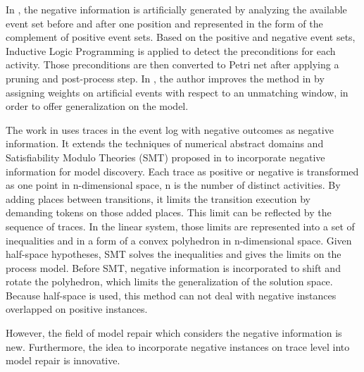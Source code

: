 In  \cite{goedertier2009robust}, the negative information is artificially generated by analyzing the available event set before and after one position and represented in the form of the complement of positive event sets. Based on the positive and negative event sets, Inductive Logic Programming is applied to detect the preconditions for each activity. Those preconditions are then converted to Petri net after applying a pruning and post-process step. In  \cite{vanden2014determining}, the author improves the method in  \cite{goedertier2009robust} by assigning weights on artificial events with respect to an unmatching window, in order to offer generalization on the model. 

The work in  \cite{ponce2016incorporating} uses traces in the event log with negative outcomes as negative information. It extends the techniques of numerical abstract domains and Satisfiability Modulo Theories (SMT) proposed in  \cite{carmona2014process} to incorporate negative information for model discovery. Each trace  as positive or negative is transformed as one point in n-dimensional space, n is the number of distinct activities. By adding places between transitions, it limits the transition execution by demanding tokens on those added places. This limit can be reflected by the sequence of traces.  In the linear system, those limits are represented into a set of inequalities and in a form of a convex polyhedron in n-dimensional space. Given half-space hypotheses, SMT solves the inequalities and gives the limits on the process model. Before SMT, negative information is incorporated to shift and rotate the polyhedron, which limits the generalization of the solution space. Because half-space is used, this method can not deal with negative instances overlapped on positive instances.


However, the field of model repair which considers the negative information is new. Furthermore, the idea to incorporate negative instances on trace level into model repair is innovative.  

\iffalse
Compared to this, our approach is innovative mainly in the following aspects. 
\begin{itemize}
	\item Incorporate the negative information into model repair. 
	\item Analyze the long-term dependency in the model to provide a preciser result. 
	\item Analyze Model on Trace level. All activities constituting a trace are considered. 
\end{itemize}
\fi